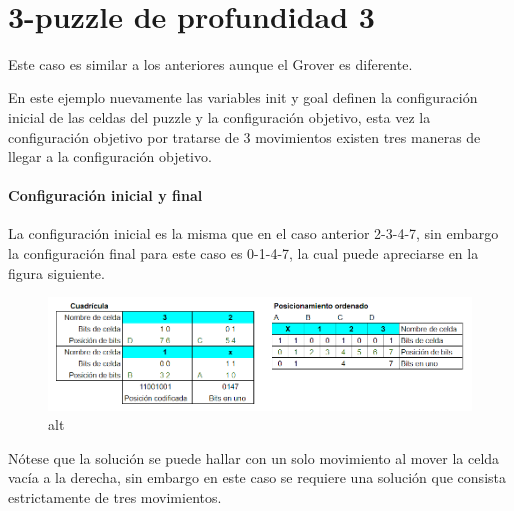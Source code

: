 \documentclass[11pt]{article}
\newcommand{\prompt}[4]{
        {\ttfamily\llap{{\color{#2}[#3]:\hspace{3pt}#4}}\vspace{-\baselineskip}}
    }
\begin{document}
            
\prompt{Out}{outcolor}{5}{}
    
    \begin{center}
    \end{center}
    { \hspace*{\fill} \\}
    

    \hypertarget{profundidad-3}{%
\section{3-puzzle de profundidad 3}\label{profundidad-3}}

Este caso es similar a los anteriores aunque el Grover es diferente.

En este ejemplo nuevamente las variables init y goal definen la
configuración inicial de las celdas del puzzle y la configuración
objetivo, esta vez la configuración objetivo por tratarse de 3
movimientos existen tres maneras de llegar a la configuración objetivo.

\hypertarget{configuraciuxf3n-inicial-y-final}{%
\paragraph{Configuración inicial y
final}\label{configuraciuxf3n-inicial-y-final}}

La configuración inicial es la misma que en el caso anterior 2-3-4-7,
sin embargo la configuración final para este caso es 0-1-4-7, la cual
puede apreciarse en la figura siguiente.

\begin{figure}
\centering
\includegraphics{Posicion-final2.png}
\caption{alt}
\end{figure}

Nótese que la solución se puede hallar con un solo movimiento al mover
la celda vacía a la derecha, sin embargo en este caso se requiere una
solución que consista estrictamente de tres movimientos.
\end{document}
